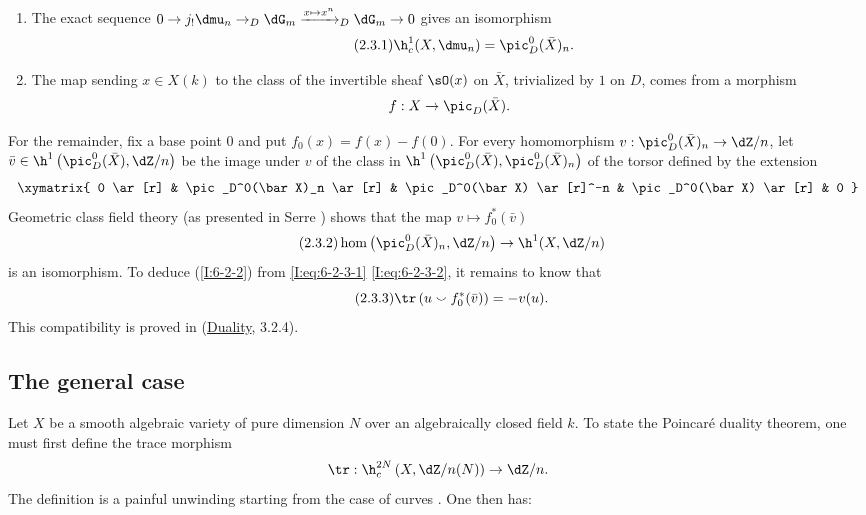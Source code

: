 \begin{enumerate}[\indent a)]
  \item {}The exact sequence
    $0\to j_!\dmu_n\to_D\dG_m\xrightarrow{x\mapsto x^n}_D\dG_m\to0$ gives an
    isomorphism
    \begin{equation*}\tag{2.3.1}\label{I:eq:6-2-3-1}
      \h_c^1(X,\dmu_n) = \pic_D^0(\bar X)_n \text{.}
    \end{equation*}
  \item The map sending $x\in X(k)$ to the class of the invertible sheaf
    $\sO(x)$ on $\bar X$, trivialized by $1$ on $D$, comes from a
    morphism
    \[
      f:X \to \pic_D(\bar X) \text{.}
    \]
\end{enumerate}
For the remainder, fix a base point $0$ and put
$f_0(x)=f(x)-f(0)$. For every homomorphism
$v:\pic_D^0(\bar X)_n\to\dZ/n$, let
$\bar v\in\h^1\left(\pic_D^0(\bar X),\dZ/n\right)$ be the image under
$v$ of the class in
$\h^1\left(\pic_D^0(\bar X),\pic_D^0(\bar X)_n\right)$ of the torsor
defined by the extension
\[\xymatrix{
  0 \ar[r]
    & \pic_D^0(\bar X)_n \ar[r]
    & \pic_D^0(\bar X) \ar[r]^-n
    & \pic_D^0(\bar X) \ar[r]
    & 0
}\]
Geometric class field theory (as presented in Serre ) shows
that the map $v\mapsto f_0^*(\bar v)$
\begin{equation*}\tag{2.3.2}\label{I:eq:6-2-3-2}
  \hom\left(\pic_D^0(\bar X)_n,\dZ/n\right) \to \h^1(X,\dZ/n)
\end{equation*}
is an isomorphism. To deduce (\ref{I:6-2-2}) from
\eqref{I:eq:6-2-3-1} \eqref{I:eq:6-2-3-2}, it remains to know that
\begin{equation*}\tag{2.3.3}\label{I:eq:6-2-3-3}
  \tr\left(u \smallsmile f_0^*(\bar v)\right) = -v(u) \text{.} \end{equation*}
This compatibility is proved in (\hyperref[V]{Duality}, 3.2.4).


\subsection{The general case}\label{I:6-3}

Let $X$ be a smooth algebraic variety of pure dimension $N$ over an
algebraically closed field $k$. To state the Poincaré duality theorem,
one must first define the trace morphism
\[
  \tr : \h_c^{2N}\left(X,\dZ/n(N)\right) \to \dZ/n\text{.}
\]
The definition is a painful unwinding starting from the case of curves
. One then has:

